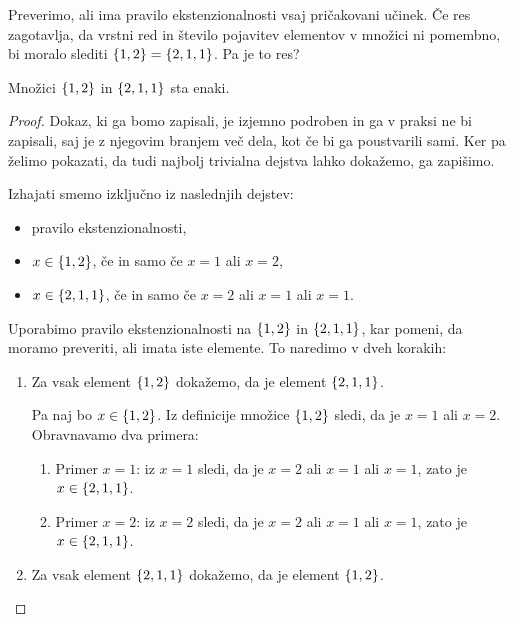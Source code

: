 Preverimo, ali ima pravilo ekstenzionalnosti vsaj pričakovani učinek.
%
Če res zagotavlja, da vrstni red in število pojavitev elementov v množici ni pomembno, bi moralo slediti
$\left\{1, 2\right\} = \left\{2, 1, 1\right\}$. Pa je to res?

\begin{trditev}
  Množici $\left\{1, 2\right\}$ in $\left\{2, 1, 1\right\}$ sta enaki.
\end{trditev}

\begin{proof}
  Dokaz, ki ga bomo zapisali, je izjemno podroben in ga v praksi ne bi zapisali,
  saj je z njegovim branjem več dela, kot če bi ga poustvarili sami. Ker pa želimo pokazati, da
  tudi najbolj trivialna dejstva lahko dokažemo, ga zapišimo.

  Izhajati smemo izključno iz naslednjih dejstev:
  \begin{itemize}
  \item pravilo ekstenzionalnosti,
  \item $x \in \left\{1, 2\right\}$, če in samo če $x = 1$ ali $x = 2$,
  \item $x \in \left\{2, 1, 1\right\}$, če in samo če $x = 2$ ali $x = 1$ ali $x = 1$.
  \end{itemize}
  Uporabimo pravilo ekstenzionalnosti na $\left\{1, 2\right\}$ in
  $\left\{2, 1, 1\right\}$, kar pomeni, da moramo preveriti, ali imata iste elemente. To
  naredimo v dveh korakih:
  \begin{enumerate}
  \item Za vsak element $\left\{1, 2\right\}$ dokažemo, da je element $\left\{2, 1, 1\right\}$.

    Pa naj bo $x \in \left\{1, 2\right\}$. Iz definicije množice $\left\{1, 2\right\}$
    sledi, da je $x = 1$ ali $x = 2$. Obravnavamo dva primera:
    \begin{enumerate}
    \item Primer $x = 1$: iz $x = 1$ sledi, da je $x = 2$ ali $x = 1$ ali $x = 1$, zato je $x \in \left\{2, 1, 1\right\}$.
    \item Primer $x = 2$: iz $x = 2$ sledi, da je $x = 2$ ali $x = 1$ ali $x = 1$, zato je $x \in \left\{2, 1, 1\right\}$.
    \end{enumerate}
  \item Za vsak element $\left\{2, 1, 1\right\}$ dokažemo, da je element $\left\{1, 2\right\}$.


\end{enumerate}
\end{proof}
